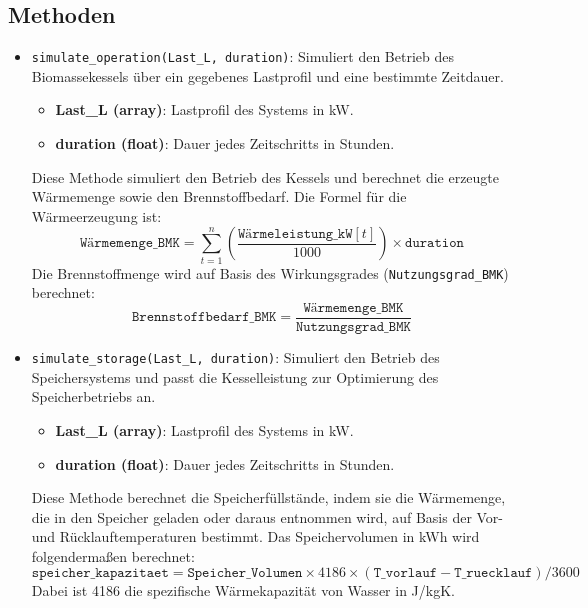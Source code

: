 \subsection{Methoden}
\begin{itemize}
    \item \texttt{simulate\_operation(Last\_L, duration)}: Simuliert den Betrieb des Biomassekessels über ein gegebenes Lastprofil und eine bestimmte Zeitdauer.
    \begin{itemize}
        \item \textbf{Last\_L (array)}: Lastprofil des Systems in kW.
        \item \textbf{duration (float)}: Dauer jedes Zeitschritts in Stunden.
    \end{itemize}
    
    Diese Methode simuliert den Betrieb des Kessels und berechnet die erzeugte Wärmemenge sowie den Brennstoffbedarf. Die Formel für die Wärmeerzeugung ist:
    \[
    \texttt{Wärmemenge\_BMK} = \sum_{t=1}^{n} \left( \frac{\texttt{Wärmeleistung\_kW}[t]}{1000} \right) \times \texttt{duration}
    \]
    Die Brennstoffmenge wird auf Basis des Wirkungsgrades (\texttt{Nutzungsgrad\_BMK}) berechnet:
    \[
    \texttt{Brennstoffbedarf\_BMK} = \frac{\texttt{Wärmemenge\_BMK}}{\texttt{Nutzungsgrad\_BMK}}
    \]

    \item \texttt{simulate\_storage(Last\_L, duration)}: Simuliert den Betrieb des Speichersystems und passt die Kesselleistung zur Optimierung des Speicherbetriebs an.
    \begin{itemize}
        \item \textbf{Last\_L (array)}: Lastprofil des Systems in kW.
        \item \textbf{duration (float)}: Dauer jedes Zeitschritts in Stunden.
    \end{itemize}
    
    Diese Methode berechnet die Speicherfüllstände, indem sie die Wärmemenge, die in den Speicher geladen oder daraus entnommen wird, auf Basis der Vor- und Rücklauftemperaturen bestimmt. Das Speichervolumen in kWh wird folgendermaßen berechnet:
    \[
    \texttt{speicher\_kapazitaet} = \texttt{Speicher\_Volumen} \times 4186 \times (\texttt{T\_vorlauf} - \texttt{T\_ruecklauf}) / 3600
    \]
    Dabei ist 4186 die spezifische Wärmekapazität von Wasser in J/kgK.


\end{itemize}
